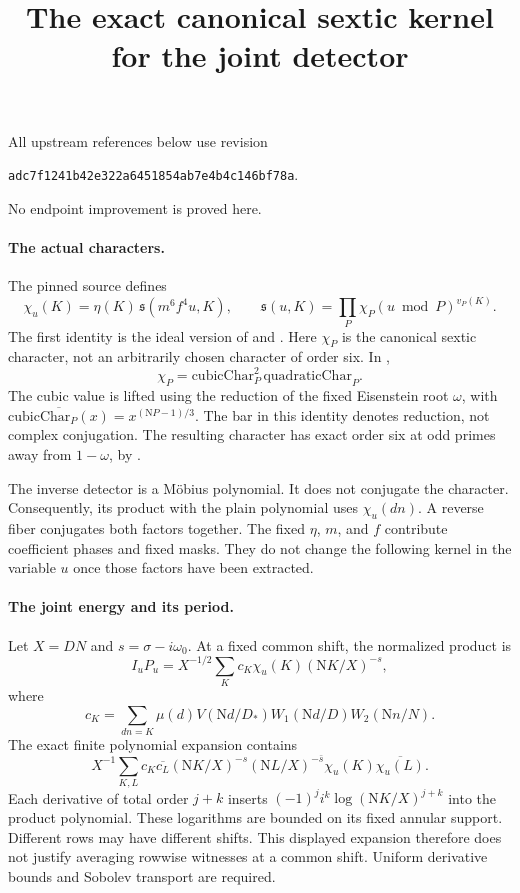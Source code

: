 \documentclass[11pt]{article}
\newcommand{\Nm}{\mathrm N}
\begin{document}
\title{The exact canonical sextic kernel for the joint detector}
\author{}
\date{}
\maketitle

All upstream references below use revision
\begin{center}
\texttt{adc7f1241b42e322a6451854ab7e4b4c146bf78a}.
\end{center}
No endpoint improvement is proved here.

\paragraph{The actual characters.}
The pinned source defines
\[
 \chi_u(K)=\eta(K)\,\mathfrak s(m^6f^4u,K),\qquad
 \mathfrak s(u,K)=\prod_{P}\chi_P(u\bmod P)^{v_P(K)}.
\]
The first identity is the ideal version of
 and
.
Here \(\chi_P\) is the canonical sextic character, not an arbitrarily
chosen character of order six. In
,
\[
 \chi_P=\mathrm{cubicChar}_P^2\,\mathrm{quadraticChar}_P.
\]
The cubic value is lifted using the reduction of the fixed Eisenstein
root \(\omega\), with
\(\overline{\mathrm{cubicChar}_P(x)}=x^{(\Nm P-1)/3}\).
The bar in this identity denotes reduction, not complex conjugation.
The resulting character has exact order six at odd primes away from
\(1-\omega\), by
.

The inverse detector is a M\"obius polynomial. It does not conjugate
the character. Consequently, its product with the plain polynomial
uses \(\chi_u(dn)\). A reverse fiber conjugates both factors together.
The fixed \(\eta\), \(m\), and \(f\) contribute coefficient phases and
fixed masks. They do not change the following kernel in the variable
\(u\) once those factors have been extracted.

\paragraph{The joint energy and its period.}
Let \(X=DN\) and \(s=\sigma-i\omega_0\). At a fixed common shift,
the normalized product is
\[
 I_u P_u=X^{-1/2}\sum_K c_K\chi_u(K)
       (\Nm K/X)^{-s},
\]
where
\[
 c_K=\sum_{dn=K}\mu(d)V(\Nm d/D_*)W_1(\Nm d/D)W_2(\Nm n/N).
\]
The exact finite polynomial expansion contains
\[
 X^{-1}\sum_{K,L} c_K\overline{c_L}
 (\Nm K/X)^{-s}(\Nm L/X)^{-\bar s}
 \chi_u(K)\overline{\chi_u(L)}.
\]
Each derivative of total order \(j+k\) inserts
\((-1)^ji^k\log(\Nm K/X)^{j+k}\) into the product polynomial.
These logarithms are bounded on its fixed annular support.
Different rows may have different shifts. This displayed expansion
therefore does not justify averaging rowwise witnesses at a common
shift. Uniform derivative bounds and Sobolev transport are required.
\end{document}
